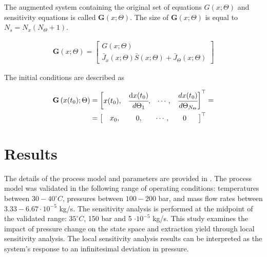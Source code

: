 \documentclass[a4paper,fleqn]{cas-dc}
\begin{document}
	The augmented system containing the original set of equations $G(x;\Theta)$ and sensitivity equations is called ${\textbf{G}}\left(x;\Theta\right)$. The size of ${\textbf{G}}\left(x;\Theta\right)$ is equal to $N_s = N_x(N_\Theta + 1)$.
	
	{\footnotesize
		\begin{align}
			{\textbf{G}}\left(x;\Theta\right) = 
			\begin{bmatrix}
				G(x;\Theta)\\
				{\bar{J}_x}(x;\Theta)\bar{S}(x;\Theta) + {\bar{J}_\Theta}(x;\Theta)
			\end{bmatrix}
	\end{align} }
	
	The initial conditions are described as
	
	{\footnotesize
		\begin{align}
			{\textbf{G}}\left(x(t_0);\Theta\right)  &= 
			\begin{bmatrix}
				x(t_0),						               &
				\cfrac{ \text{d}x(t_0) }{ d{\Theta_1} },		   &
				\cdots,					 				   &
				\cfrac{ dx(t_0) }{ d{\Theta_{N_\Theta}} }            
			\end{bmatrix}^\top = \\ &=
			\begin{bmatrix} 
				\quad x_0,	                               &
				\quad ~0,		                           &
				\quad \cdots,			                   &
				\quad 0 \quad~~
			\end{bmatrix}^\top \nonumber
	\end{align} }
	
	
	\section{Results} \label{CH: Results}
	The details of the process model and parameters are provided in \citet{Sliczniuk2024}. The process model was validated in the following range of operating conditions: temperatures between $30 - 40 ^\circ C$, pressures between $100 - 200$ bar, and mass flow rates between $3.33-6.67 \cdot 10^{-5}$ kg/s. The sensitivity analysis is performed at the midpoint of the validated range: $35 ^\circ C$, 150 bar and 5 $\cdot 10^{-5}$ kg/s. This study examines the impact of pressure change on the state space and extraction yield through local sensitivity analysis. The local sensitivity analysis results can be interpreted as the system's response to an infinitesimal deviation in pressure.
	
\end{document}
